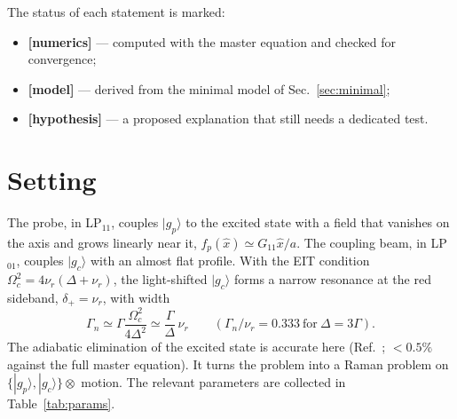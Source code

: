 \documentclass[11pt,a4paper]{article}
\newcommand{\ket}[1]{|#1\rangle}
\newcommand{\gp}{\ket{g_p}}
\newcommand{\gc}{\ket{g_c}}
\newcommand{\Om}{\Omega}
\newcommand{\nur}{\nu_r}
\begin{document}
The status of each statement is marked:
\begin{itemize}
\item \textbf{[numerics]} --- computed with the master equation and checked for convergence;
\item \textbf{[model]} --- derived from the minimal model of Sec.~\ref{sec:minimal};
\item \textbf{[hypothesis]} --- a proposed explanation that still needs a dedicated test.
\end{itemize}

\section{Setting}
\label{sec:setting}
The probe, in LP$_{11}$, couples $\gp$ to the excited state with a field that vanishes on the axis and grows linearly near it, $f_p(\hat x)\simeq G_{11}\hat x/a$. The coupling beam, in LP$_{01}$, couples $\gc$ with an almost flat profile. With the EIT condition $\Om_c^2=4\nur(\Delta+\nur)$, the light-shifted $\gc$ forms a narrow resonance at the red sideband, $\delta_+=\nur$, with width
\begin{equation}
  \Gamma_n\simeq\Gamma\frac{\Om_c^2}{4\Delta^2}\simeq\frac{\Gamma}{\Delta}\,\nur\qquad(\Gamma_n/\nur=0.333\ \text{for}\ \Delta=3\Gamma).
\end{equation}
The adiabatic elimination of the excited state is accurate here (Ref.~\cite{reiter2012}; $<0.5\%$ against the full master equation). It turns the problem into a Raman problem on $\{\gp,\gc\}\otimes$ motion. The relevant parameters are collected in Table~\ref{tab:params}.
\end{document}
